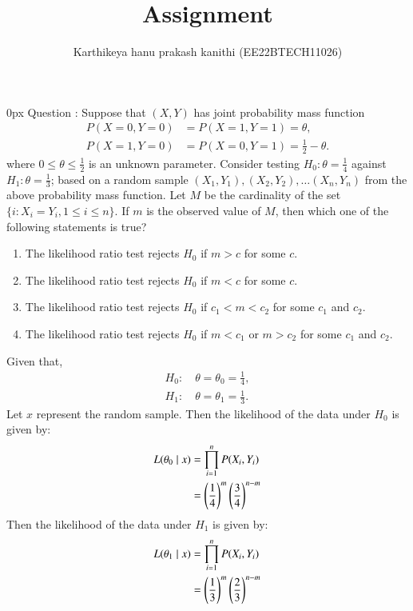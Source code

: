 \documentclass[article]{IEEEtran}
\theoremstyle{remark}
\begin{document}
\let\vec\mathbf


\title{
Assignment
}
\author{ Karthikeya hanu prakash kanithi (EE22BTECH11026)}
\maketitle
\parindent0px
\vspace{3cm}
Question : Suppose that $(X, Y)$ has joint probability mass function
\begin{align}
P(X = 0, Y = 0) &= P(X = 1, Y = 1) = \theta, \\
P(X = 1, Y = 0) &= P(X = 0, Y = 1) = \frac{1}{2} - \theta.
\end{align}
where $0 \le \theta \le \frac{1}{2}$ is an unknown parameter. Consider testing $H_0 : \theta = \frac{1}{4}$ against $H_1 : \theta = \frac{1}{3}$; based on a random sample ${(X_1 , Y_1 ), (X_2 , Y_2 ), \ldots (X_n , Y_n )}$ from the above probability mass function. Let $M$ be the cardinality of the set $\{i: X_i = Y_i , 1 \le i\le n\}$. If $m$ is the observed value of $M$, then which one of the following statements is true?
\begin{enumerate}
\item The likelihood ratio test rejects $H_0$ if $m > c$ for some $c$.
\item The likelihood ratio test rejects $H_0$ if $m < c$ for some $c$.
\item The likelihood ratio test rejects $H_0$ if $c_1 < m < c_2$ for some $c_1$ and $c_2$.
\item The likelihood ratio test rejects $H_0$ if $m < c_1$ or $m > c_2$ for some $c_1$ and $c_2$.
\end{enumerate}
\solution 
Given that,
\begin{align}
	H_0 : \quad \theta = \theta_0 = \frac{1}{4},\\
	H_1 : \quad \theta = \theta_1 = \frac{1}{3}.
\end{align}
Let $x$ represent the random sample. Then the likelihood of the data under $H_0$ is given by: 
\begin{align}
    L(\theta_0 \mid x) &= \prod_{i=1}^{n} P(X_i, Y_i) \\
    &= \left(\frac{1}{4}\right)^m\left(\frac{3}{4}\right)^{n-m}
\end{align}
Then the likelihood of the data under $H_1$ is given by:
\begin{align}
    L(\theta_1 \mid x) &= \prod_{i=1}^{n} P(X_i, Y_i) \\
    &= \left(\frac{1}{3}\right)^m\left(\frac{2}{3}\right)^{n-m}
\end{align}
\end{document}
